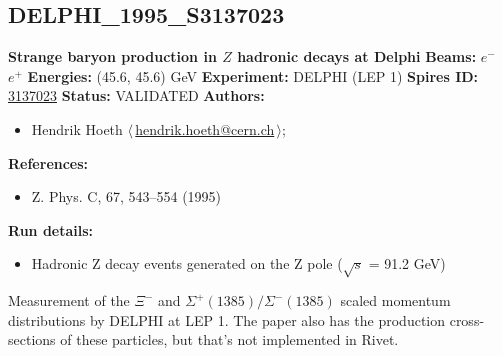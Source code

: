 \subsection[DELPHI\_1995\_S3137023]{DELPHI\_1995\_S3137023\,\cite{Abreu:1995qx}}
\textbf{Strange baryon production in $Z$ hadronic decays at Delphi}\newline
\textbf{Beams:} $e^-$\,$e^+$ \newline
\textbf{Energies:} (45.6, 45.6) GeV \newline
\textbf{Experiment:} DELPHI (LEP 1) \newline
\textbf{Spires ID:} \href{http://www.slac.stanford.edu/spires/find/hep/www?rawcmd=key+3137023}{3137023}\newline
\textbf{Status:} VALIDATED\newline
\textbf{Authors:}
\begin{itemize}
  \item Hendrik Hoeth $\langle\,$\href{mailto:hendrik.hoeth@cern.ch}{hendrik.hoeth@cern.ch}$\,\rangle$;
\end{itemize}
\textbf{References:}
\begin{itemize}
  \item Z. Phys. C, 67, 543--554 (1995)
\end{itemize}
\textbf{Run details:}
\begin{itemize}

  \item Hadronic Z decay events generated on the Z pole (\ensuremath{\sqrt{s}} = 91.2 GeV)\end{itemize}

\noindent Measurement of the $\Xi^-$ and $\Sigma^+(1385)/\Sigma^-(1385)$ scaled momentum distributions by DELPHI at LEP 1. The paper also has the production cross-sections of these particles, but that's not implemented in Rivet.

\clearpage


\clearpage

